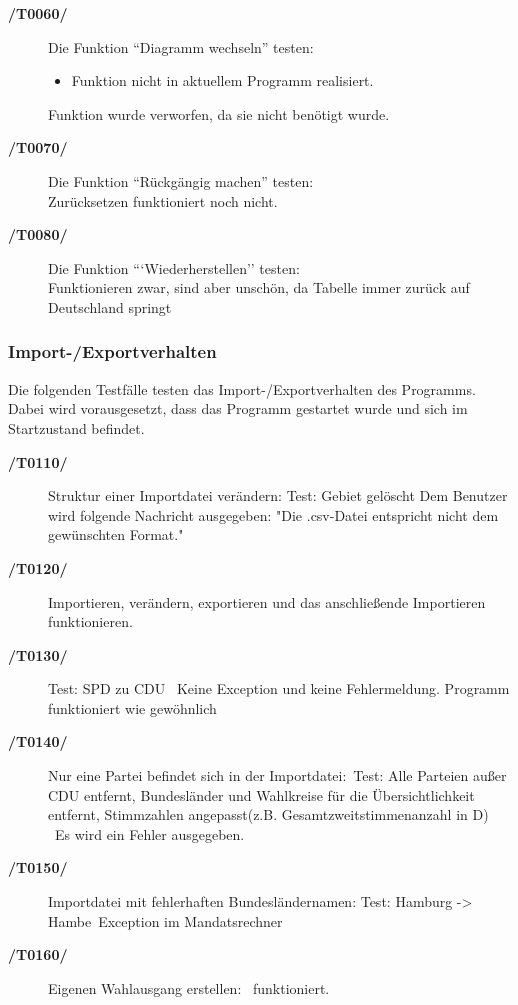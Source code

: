 \documentclass[12pt,a4paper,titlepage]{article}
\begin{document}
\begin{description}
	\item[\textbf{/T0060/}] Die Funktion ``Diagramm wechseln'' testen:\\
	\begin{itemize}
	\item Funktion nicht in aktuellem Programm realisiert.
	\end{itemize}
	Funktion wurde verworfen, da sie nicht benötigt wurde.
	
	\item[\textbf{/T0070/}] Die Funktion ``Rückgängig machen'' testen: \\
	Zurücksetzen funktioniert noch nicht.
	\item[\textbf{/T0080/}] Die Funktion ```Wiederherstellen'' testen: \\

Funktionieren zwar, sind aber unschön, da Tabelle immer zurück auf Deutschland springt
	

\end{description}
\subsubsection{Import-/Exportverhalten}
Die folgenden Testfälle testen das Import-/Exportverhalten des Programms. Dabei wird vorausgesetzt, dass das Programm gestartet wurde und sich im Startzustand befindet. 
\begin{description}
	\item[\textbf{/T0110/}] Struktur einer Importdatei verändern: \newline
	Test: Gebiet gelöscht \newline
	Dem Benutzer wird folgende Nachricht ausgegeben: "Die .csv-Datei entspricht nicht dem gewünschten Format."\\
	\item[\textbf{/T0120/}] 
	Importieren, verändern, exportieren und das anschließende Importieren funktionieren.\\ 
	\item[\textbf{/T0130/}] 
	Test: SPD zu CDU \
	Keine Exception und keine Fehlermeldung. Programm funktioniert wie gewöhnlich
	\item[\textbf{/T0140/}] Nur eine Partei befindet sich in der Importdatei:\
	Test: Alle Parteien außer CDU entfernt, Bundesländer und Wahlkreise für die Übersichtlichkeit entfernt, Stimmzahlen angepasst(z.B. Gesamtzweitstimmenanzahl in D) \
	Es wird ein Fehler ausgegeben.\\
	 \newline

	\item[\textbf{/T0150/}] Importdatei mit fehlerhaften Bundesländernamen:
	Test: Hamburg -> Hambe\
	Exception im Mandatsrechner
	\item[\textbf{/T0160/}] Eigenen Wahlausgang erstellen: \
	funktioniert.
\end{description}
\end{document}
